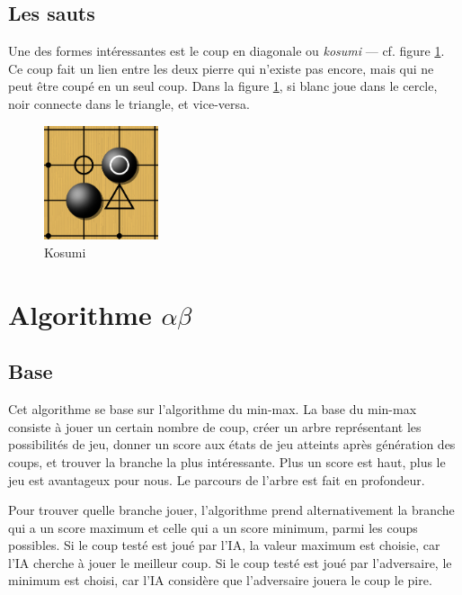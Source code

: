 \documentclass[11pt,a4paper,titlepage,french]{article}
\begin{document}
		\subsection{Les sauts}

			Une des formes intéressantes est le coup en diagonale ou \emph{kosumi} --- cf. figure \ref{kosumi}. Ce coup fait un lien entre les deux pierre qui n'existe pas encore, mais qui ne peut être coupé en un seul coup. Dans la figure \ref{kosumi}, si blanc joue dans le cercle, noir connecte dans le triangle, et vice-versa.

			\begin{figure}[hbt]
			\label{kosumi}
			\begin{center}
			\includegraphics[width=0.3\textwidth]{kosumi.png}
			\end{center}
			\caption{Kosumi}
			\end{figure}

	\section[Algorithme alpha beta]{Algorithme $\alpha\beta$}
	\label{alphab}
		\subsection{Base}
			Cet algorithme se base sur l'algorithme du min-max. La base du min-max consiste à jouer un certain nombre de coup, créer un arbre représentant les possibilités de jeu, donner un score aux états de jeu atteints après génération des coups, et trouver la branche la plus intéressante. Plus un score est haut, plus le jeu est avantageux pour nous. Le parcours de l'arbre est fait en profondeur.

			Pour trouver quelle branche jouer, l'algorithme prend alternativement la branche qui a un score maximum et celle qui a un score minimum, parmi les coups possibles. Si le coup testé est joué par l'IA, la valeur maximum est choisie, car l'IA cherche à jouer le meilleur coup. Si le coup testé est joué par l'adversaire, le minimum est choisi, car l'IA considère que l'adversaire jouera le coup le pire.
\end{document}
